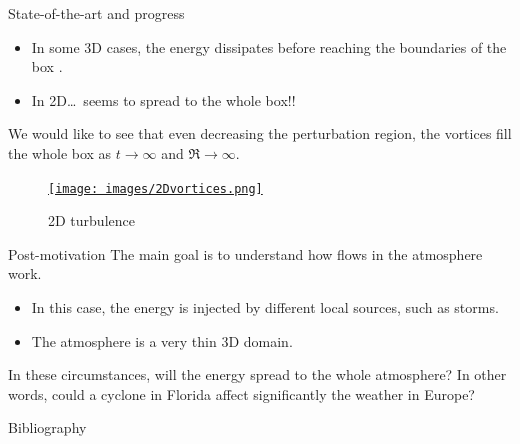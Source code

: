\documentclass{beamer} %
\begin{document}
\begin{frame}{State-of-the-art and progress}
	\begin{itemize}
		\item In some 3D cases, the energy dissipates before reaching the boundaries of the box \cite{alexakis}.
		\item In 2D\ldots\ seems to spread to the whole box!!
	\end{itemize}
	We would like to see that even decreasing the perturbation region, the vortices fill the whole box as $t\to\infty$ and $\Re\to\infty$.

	\vspace{0.3cm}
	\begin{figure}
		\centering
		\href{run:./videos/Re64.mp4}{
			\texttt{[image: images/2Dvortices.png]}
		}
		\caption{2D turbulence}
	\end{figure}
\end{frame}
\begin{frame}{Post-motivation}
	The main goal is to understand how flows in the atmosphere work.
	\begin{itemize}
		\item In this case, the energy is injected by different local sources, such as storms.
		\item The atmosphere is a very thin 3D domain.
	\end{itemize}
	In these circumstances, will the energy spread to the whole atmosphere? In other words, could a cyclone in Florida affect significantly the weather in Europe?
\end{frame}

\thispagestyle{empty}
\begin{frame}[noframenumbering]{Bibliography}
	\printbibliography
\end{frame}
\end{document}
